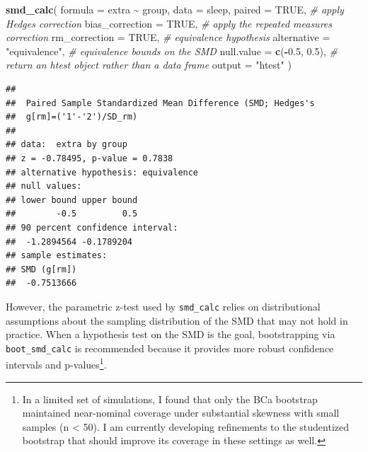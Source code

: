 \documentclass[]{interact}
\theoremstyle{plain}%
\theoremstyle{definition}
\theoremstyle{remark}
\newenvironment{Shaded}{\begin{snugshade}}{\end{snugshade}}
\newcommand{\AttributeTok}[1]{\textcolor[rgb]{0.13,0.29,0.53}{#1}}
\newcommand{\CommentTok}[1]{\textcolor[rgb]{0.56,0.35,0.01}{\textit{#1}}}
\newcommand{\ConstantTok}[1]{\textcolor[rgb]{0.56,0.35,0.01}{#1}}
\newcommand{\FloatTok}[1]{\textcolor[rgb]{0.00,0.00,0.81}{#1}}
\newcommand{\FunctionTok}[1]{\textcolor[rgb]{0.13,0.29,0.53}{\textbf{#1}}}
\newcommand{\NormalTok}[1]{#1}
\newcommand{\SpecialCharTok}[1]{\textcolor[rgb]{0.81,0.36,0.00}{\textbf{#1}}}
\newcommand{\StringTok}[1]{\textcolor[rgb]{0.31,0.60,0.02}{#1}}
\begin{document}
\begin{Shaded}
\begin{Highlighting}[]
\FunctionTok{smd\_calc}\NormalTok{(}
  \AttributeTok{formula =}\NormalTok{ extra }\SpecialCharTok{\textasciitilde{}}\NormalTok{ group,}
  \AttributeTok{data =}\NormalTok{ sleep,}
  \AttributeTok{paired =} \ConstantTok{TRUE}\NormalTok{,}
  \CommentTok{\# apply Hedges\textquotesingle{} correction}
  \AttributeTok{bias\_correction =} \ConstantTok{TRUE}\NormalTok{,}
  \CommentTok{\# apply the repeated measures correction}
  \AttributeTok{rm\_correction =} \ConstantTok{TRUE}\NormalTok{,}
  \CommentTok{\# equivalence hypothesis}
  \AttributeTok{alternative =} \StringTok{"equivalence"}\NormalTok{,}
  \CommentTok{\# equivalence bounds on the SMD}
  \AttributeTok{null.value =} \FunctionTok{c}\NormalTok{(}\SpecialCharTok{{-}}\FloatTok{0.5}\NormalTok{, }\FloatTok{0.5}\NormalTok{),}
  \CommentTok{\# return an htest object rather than a data frame}
  \AttributeTok{output =} \StringTok{"htest"}
\NormalTok{)}
\end{Highlighting}
\end{Shaded}

\begin{verbatim}
## 
##  Paired Sample Standardized Mean Difference (SMD; Hedges's
##  g[rm]=('1'-'2')/SD_rm)
## 
## data:  extra by group
## z = -0.78495, p-value = 0.7838
## alternative hypothesis: equivalence
## null values:
## lower bound upper bound 
##        -0.5         0.5 
## 90 percent confidence interval:
##  -1.2894564 -0.1789204
## sample estimates:
## SMD (g[rm]) 
##  -0.7513666
\end{verbatim}

However, the parametric z-test used by \texttt{smd\_calc} relies on
distributional assumptions about the sampling distribution of the SMD
that may not hold in practice. When a hypothesis test on the SMD is the
goal, bootstrapping via \texttt{boot\_smd\_calc} is recommended because
it provides more robust confidence intervals and p-values\footnote{In a
  limited set of simulations, I found that only the BCa bootstrap
  maintained near-nominal coverage under substantial skewness with small
  samples (n \textless{} 50). I am currently developing refinements to
  the studentized bootstrap that should improve its coverage in these
  settings as well.}.
\end{document}
